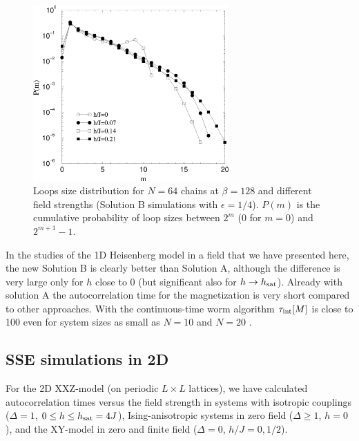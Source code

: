\documentclass[10pt,pre,aps,twocolumn,showpacs,superscriptaddress,
floatfix]{revtex4}
\begin{document}
\begin{figure}
\includegraphics[clip,width=7.5cm]{fig18.eps}
\caption{Loops size distribution for $N=64$ chains at $\beta=128$ and 
different field strengths (Solution B simulations with $\epsilon=1/4$). 
$P(m)$ is the cumulative probability of loop sizes between $2^m$ 
($0$ for $m=0$) and $2^{m+1}-1$.}
\label{hist}
\end{figure}

In the studies of the 1D Heisenberg model in a field that we have
presented here, the new Solution B is clearly better than Solution A, 
although the difference is very large only for $h$ close to $0$ (but 
significant also for $h \to h_{\rm sat}$). Already with solution A 
the autocorrelation time for the magnetization is very short compared 
to other approaches. With the continuous-time worm algorithm 
$\tau_{\rm int}[M]$ is close to 100 even for system sizes as small as 
$N=10$ and $N=20$ \cite{kashurnikov}. 

\subsection{SSE simulations in 2D}

For the 2D XXZ-model (on periodic $L\times L$ lattices), we have calculated 
autocorrelation times versus the field strength in systems with isotropic 
couplings ($\Delta = 1$, $0 \le h \le h_{\rm sat} = 4J$), Ising-anisotropic 
systems in zero field ($\Delta \ge 1$, $h=0$), and the XY-model in zero 
and finite field ($\Delta =0$, $h/J=0,1/2$).
\end{document}
